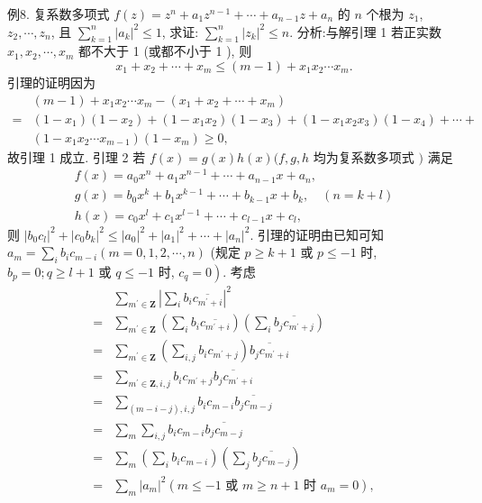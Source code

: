 例8. 复系数多项式 $f(z)=z^n+a_1 z^{n-1}+\cdots+a_{n-1} z+a_n$ 的 $n$ 个根为 $z_1$,
$z_2, \cdots, z_n$, 且 $\sum_{k=1}^n\left|a_k\right|^2 \leqslant 1$, 求证: $\sum_{k=1}^n\left|z_k\right|^2 \leqslant n$.
分析:与解引理 1 若正实数 $x_1, x_2, \cdots, x_m$ 都不大于 1 (或都不小于 1 ), 则
$$
x_1+x_2+\cdots+x_m \leqslant(m-1)+x_1 x_2 \cdots x_m .
$$
引理的证明因为
$$
\begin{aligned}
& (m-1)+x_1 x_2 \cdots x_m-\left(x_1+x_2+\cdots+x_m\right) \\
= & \left(1-x_1\right)\left(1-x_2\right)+\left(1-x_1 x_2\right)\left(1-x_3\right)+\left(1-x_1 x_2 x_3\right)\left(1-x_4\right)+\cdots+ \\
& \left(1-x_1 x_2 \cdots x_{m-1}\right)\left(1-x_m\right) \geqslant 0,
\end{aligned}
$$
故引理 1 成立.
引理 2 若 $f(x)=g(x) h(x)(f, g, h$ 均为复系数多项式 $)$ 满足
$$
\begin{gathered}
f(x)=a_0 x^n+a_1 x^{n-1}+\cdots+a_{n-1} x+a_n, \\
g(x)=b_0 x^k+b_1 x^{k-1}+\cdots+b_{k-1} x+b_k, \quad(n=k+l) \\
h(x)=c_0 x^l+c_1 x^{l-1}+\cdots+c_{l-1} x+c_l,
\end{gathered}
$$
则 $\left|b_0 c_l\right|^2+\left|c_0 b_k\right|^2 \leqslant\left|a_0\right|^2+\left|a_1\right|^2+\cdots+\left|a_n\right|^2$.
引理的证明由已知可知 $a_m=\sum_i b_i c_{m-i}(m=0,1,2, \cdots, n)$ (规定 $p \geqslant k+1$ 或 $p \leqslant-1$ 时, $b_p=0 ; q \geqslant l+1$ 或 $q \leqslant-1$ 时, $\left.c_q=0\right)$.
考虑
$$
\begin{aligned}
& \sum_{m^{\prime} \in \mathbf{Z}}\left|\sum_i b_i \overline{c_{m^{\prime}+i}}\right|^2 \\
= & \sum_{m^{\prime} \in \mathbf{Z}}\left(\sum_i b_i \overline{c_{m^{\prime}+i}}\right)\left(\sum_i \overline{b_j c_{m^{\prime}+j}}\right) \\
= & \sum_{m^{\prime} \in \mathbf{Z}}\left(\sum_{i, j} b_i c_{m^{\prime}+j}\right) \overline{b_j c_{m^{\prime}+i}} \\
= & \sum_{m^{\prime} \in \mathbf{Z}, i, j} b_i c_{m^{\prime}+j} \overline{b_j c_{m^{\prime}+i}} \\
= & \sum_{(m-i-j), i, j} b_i c_{m-i} \overline{b_j c_{m-j}} \\
= & \sum_m \sum_{i, j} b_i c_{m-i} \overline{b_j c_{m-j}} \\
= & \sum_m\left(\sum_i b_i c_{m-i}\right)\left(\sum_j \overline{b_j c_{m-j}}\right) \\
= & \sum_m\left|a_m\right|^2\left(m \leqslant-1 \text { 或 } m \geqslant n+1 \text { 时 } a_m=0\right),
\end{aligned}
$$
